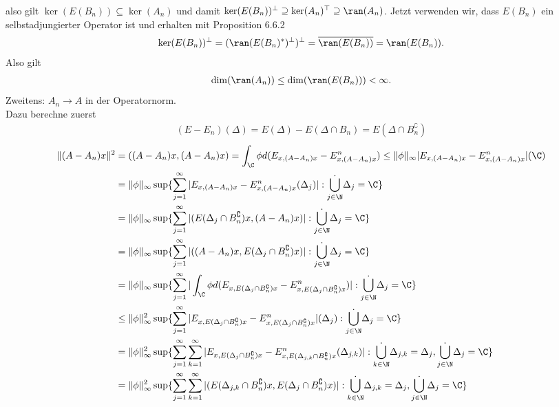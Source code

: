 \begin{solution}
also gilt $\ker(E(B_n)) \subseteq \ker(A_n)$ und damit
$\ker(E(B_n))^{\bot} \supseteq \ker(A_n)^{\top} \supseteq \ran(A_n)$.
Jetzt verwenden wir, dass $E(B_n)$ ein selbstadjungierter
Operator ist und erhalten mit Proposition 6.6.2
\begin{align*}
  \ker(E(B_n))^{\bot} = (\ran(E(B_n)^*)^{\bot})^{\bot} = \overline{\ran(E(B_n))}
  = \ran(E(B_n)).
\end{align*}
Also gilt
\begin{align*}
  \dim(\ran(A_n)) \leq \dim(\ran(E(B_n))) < \infty.
\end{align*}
Zweitens: $A_n \to A$ in der Operatornorm. \\
Dazu berechne zuerst
\begin{align*}
  (E - E_n)(\Delta) = E(\Delta) - E(\Delta \cap B_n) = E(\Delta\cap B_n^{\complement})
\end{align*}
\begin{align*}
  \|(A - A_n)x\|^2 &= ((A-A_n)x,(A-A_n)x) = \int_{\C}\phi d(E_{x,(A-A_n)x} - E^n_{x,(A-A_n)x})
  \leq \|\phi\|_{\infty}|E_{x,(A-A_n)x} - E^n_{x,(A-A_n)x}|(\C) \\
  &= \|\phi\|_{\infty}\sup\{\sum_{j=1}^{\infty}|E_{x,(A-A_n)x} - E^n_{x,(A-A_n)x}(\Delta_j)|: \dot{\bigcup_{j \in \N}}\Delta_j = \C\} \\
  &=  \|\phi\|_{\infty}\sup\{\sum_{j=1}^{\infty}|(E(\Delta_j\cap B_n^{\complement})x, (A-A_n)x)|: \dot{\bigcup_{j \in \N}}\Delta_j = \C\} \\
  &=  \|\phi\|_{\infty}\sup\{\sum_{j=1}^{\infty}|((A-A_n)x, E(\Delta_j\cap B_n^{\complement})x)|: \dot{\bigcup_{j \in \N}}\Delta_j = \C\} \\
  &=  \|\phi\|_{\infty}\sup\{\sum_{j=1}^{\infty}|\int_{\C}\phi
  d(E_{x,E(\Delta_j\cap B_n^{\complement})x} - E_{x,E(\Delta_j\cap B_n^{\complement})x}^n)|: \dot{\bigcup_{j \in \N}}\Delta_j = \C\} \\
  &\leq \|\phi\|_{\infty}^2 \sup\{\sum_{j=1}^{\infty}|
  E_{x,E(\Delta_j\cap B_n^{\complement})x} - E_{x,E(\Delta_j\cap B_n^{\complement})x}^n|(\Delta_j): \dot{\bigcup_{j \in \N}}\Delta_j = \C\} \\
  &= \|\phi\|_{\infty}^2 \sup\{\sum_{j=1}^{\infty}\sum_{k=1}^{\infty}
  |E_{x,E(\Delta_{j}\cap B_n^{\complement})x} - E_{x,E(\Delta_{j,k}\cap B_n^{\complement})x}^n(\Delta_{j,k})|: \dot{\bigcup_{k \in \N}}\Delta_{j,k} = \Delta_j, \dot{\bigcup_{j \in \N}}\Delta_j = \C\} \\
  &= \|\phi\|_{\infty}^2 \sup\{\sum_{j=1}^{\infty}\sum_{k=1}^{\infty}
  |(E(\Delta_{j,k}\cap B_n^{\complement})x,E(\Delta_j\cap B_n^{\complement})x)|: \dot{\bigcup_{k \in \N}}\Delta_{j,k} = \Delta_j, \dot{\bigcup_{j \in \N}}\Delta_j = \C\} \\

\end{align*}
\end{solution}

